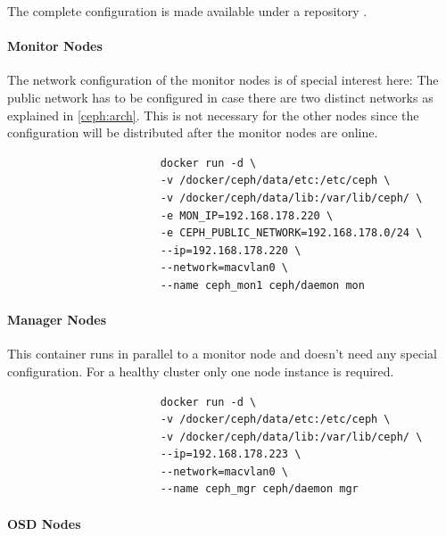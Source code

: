 \documentclass[titlepage, a4paper, 11pt]{scrartcl}
\begin{document}
                The complete configuration is made available under a repository \cite{ghceph}.

                \paragraph{Monitor Nodes}

                    The network configuration of the monitor nodes is of special interest here: The public network has to be configured in case there are two 
                    distinct networks as explained in \ref{ceph:arch}. This is not  necessary for the other nodes since the configuration will be distributed
                    after the monitor nodes are online.

                    \begin{lstlisting}
                        docker run -d \
                        -v /docker/ceph/data/etc:/etc/ceph \
                        -v /docker/ceph/data/lib:/var/lib/ceph/ \
                        -e MON_IP=192.168.178.220 \
                        -e CEPH_PUBLIC_NETWORK=192.168.178.0/24 \
                        --ip=192.168.178.220 \
                        --network=macvlan0 \
                        --name ceph_mon1 ceph/daemon mon                        
                    \end{lstlisting}

                \paragraph{Manager Nodes}

                    This container runs in parallel to a monitor node and doesn't need any special configuration. For a healthy cluster only one node instance is required.

                    \begin{lstlisting}                    
                        docker run -d \
                        -v /docker/ceph/data/etc:/etc/ceph \
                        -v /docker/ceph/data/lib:/var/lib/ceph/ \
                        --ip=192.168.178.223 \
                        --network=macvlan0 \
                        --name ceph_mgr ceph/daemon mgr
                    \end{lstlisting}

                \paragraph{OSD Nodes}
\end{document}
